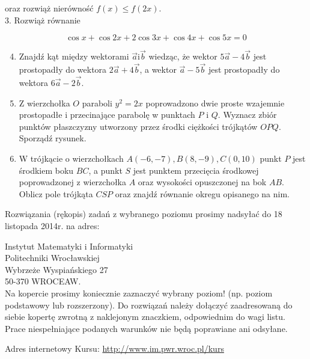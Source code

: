 \documentclass[10pt]{article}
\begin{document}
oraz rozwiąż nierówność $f(x) \leqslant f(2 x)$.\\
3. Rozwiąż równanie

$$
\cos x+\cos 2 x+2 \cos 3 x+\cos 4 x+\cos 5 x=0
$$

\begin{enumerate}
  \setcounter{enumi}{3}
  \item Znajdź kąt między wektorami $\vec{a} \mathrm{i} \vec{b}$ wiedząc, że wektor $5 \vec{a}-4 \vec{b}$ jest prostopadły do wektora $2 \vec{a}+4 \vec{b}$, a wektor $\vec{a}-5 \vec{b}$ jest prostopadły do wektora $6 \vec{a}-2 \vec{b}$.
  \item Z wierzchołka $O$ paraboli $y^{2}=2 x$ poprowadzono dwie proste wzajemnie prostopadłe i przecinające parabolę w punktach $P$ i $Q$. Wyznacz zbiór punktów płaszczyzny utworzony przez środki ciężkości trójkątów $O P Q$. Sporządź rysunek.
  \item W trójkącie o wierzchołkach $A(-6,-7), B(8,-9), C(0,10)$ punkt $P$ jest środkiem boku $B C$, a punkt $S$ jest punktem przecięcia środkowej poprowadzonej z wierzchołka $A$ oraz wysokości opuszczonej na bok $A B$. Oblicz pole trójkąta $C S P$ oraz znajdź równanie okregu opisanego na nim.
\end{enumerate}

Rozwiązania (rękopis) zadań z wybranego poziomu prosimy nadsyłać do 18 listopada 2014r. na adres:

Instytut Matematyki i Informatyki\\
Politechniki Wrocławskiej\\
Wybrzeże Wyspiańskiego 27\\
50-370 WROCEAW.\\
Na kopercie prosimy koniecznie zaznaczyć wybrany poziom! (np. poziom podstawowy lub rozszerzony). Do rozwiązań należy dołączyć zaadresowaną do siebie kopertę zwrotną z naklejonym znaczkiem, odpowiednim do wagi listu. Prace niespełniające podanych warunków nie będą poprawiane ani odsyłane.

Adres internetowy Kursu: \href{http://www.im.pwr.wroc.pl/kurs}{http://www.im.pwr.wroc.pl/kurs}
\end{document}
